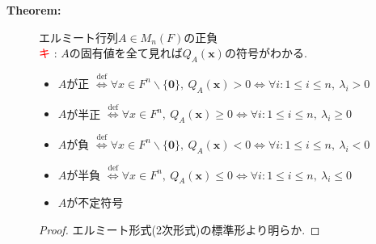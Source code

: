\documentclass[dvipdfmx]{jsarticle}
\newcommand*{\point}{\textcircled{\textcolor{red}{\scriptsize キ}} }
\newcommand{\defEq}{\overset{\mathrm{def}}{\Leftrightarrow}}
\begin{document}
\begin{description}
    \item[\bf{Theorem:}] エルミート行列$A \in M_n(F)$の正負 \\
        \point : $A$の固有値を全て見れば$Q_A(\bm{x})$の符号がわかる.
        \begin{itemize}
            \item $A$が正 $\defEq \forall x \in F^n \backslash \{ \bm{0} \},\ Q_A(\bm{x}) > 0 \Leftrightarrow \forall i : 1 \leq i \leq n,\ \lambda_i > 0$
            \item $A$が半正 $\defEq \forall x \in F^n,\ Q_A(\bm{x}) \geq 0 \Leftrightarrow \forall i : 1 \leq i \leq n,\ \lambda_i \geq 0$ 
            \item $A$が負 $\defEq \forall x \in F^n \backslash \{ \bm{0} \},\ Q_A(\bm{x}) < 0 \Leftrightarrow \forall i : 1 \leq i \leq n,\ \lambda_i < 0$ 
            \item $A$が半負 $\defEq \forall x \in F^n,\ Q_A(\bm{x}) \leq 0 \Leftrightarrow \forall i : 1 \leq i \leq n,\ \lambda_i \leq 0$ 
            \item $A$が不定符号
        \end{itemize}
        \begin{proof}
            エルミート形式(2次形式)の標準形より明らか.
        \end{proof}
    

\end{description}
\end{document}
